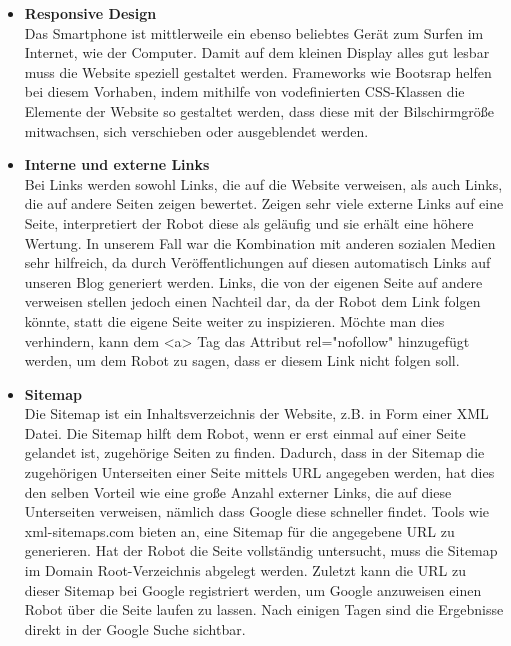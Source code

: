 {\begin{itemize}
      \item \textbf{Responsive Design}\\
        Das Smartphone ist mittlerweile ein ebenso beliebtes Gerät zum Surfen im Internet, wie der Computer. Damit auf dem kleinen Display alles gut lesbar muss die Website speziell
        gestaltet werden. Frameworks wie Bootsrap helfen bei diesem Vorhaben, indem mithilfe von vodefinierten CSS-Klassen die Elemente der Website so gestaltet werden, dass diese mit der
        Bilschirmgröße mitwachsen, sich verschieben oder ausgeblendet werden.

      \item \textbf{Interne und externe Links}\\
        Bei Links werden sowohl Links, die auf die Website verweisen, als auch Links, die auf andere Seiten zeigen bewertet.
        Zeigen sehr viele externe Links auf eine Seite, interpretiert der Robot diese als geläufig und sie erhält eine höhere Wertung. In unserem Fall war die Kombination mit anderen sozialen
        Medien sehr hilfreich, da durch Veröffentlichungen auf diesen automatisch Links auf unseren Blog generiert werden.
        Links, die von der eigenen Seite auf andere verweisen stellen jedoch einen Nachteil dar, da der Robot dem Link folgen könnte, statt die eigene Seite weiter zu inspizieren. Möchte man dies
        verhindern, kann dem <a> Tag das Attribut rel="nofollow" hinzugefügt werden, um dem Robot zu sagen, dass er diesem Link nicht folgen soll.

      \item \textbf{Sitemap}\\
      	Die Sitemap ist ein Inhaltsverzeichnis der Website, z.B. in Form einer XML Datei. Die Sitemap hilft dem Robot, wenn er erst einmal auf einer Seite gelandet ist, zugehörige Seiten
        zu finden. Dadurch, dass in der Sitemap die zugehörigen Unterseiten einer Seite mittels URL angegeben werden, hat dies den selben Vorteil wie eine große Anzahl externer Links, die auf diese
        Unterseiten verweisen, nämlich dass Google diese schneller findet. Tools wie xml-sitemaps.com bieten an, eine Sitemap für die angegebene URL zu generieren. Hat der Robot die Seite vollständig
        untersucht, muss die Sitemap im Domain Root-Verzeichnis abgelegt werden. Zuletzt kann die URL zu dieser Sitemap bei Google registriert werden, um Google anzuweisen einen Robot über die Seite
        laufen zu lassen. Nach einigen Tagen sind die Ergebnisse direkt in der Google Suche sichtbar.


\end{itemize}}
